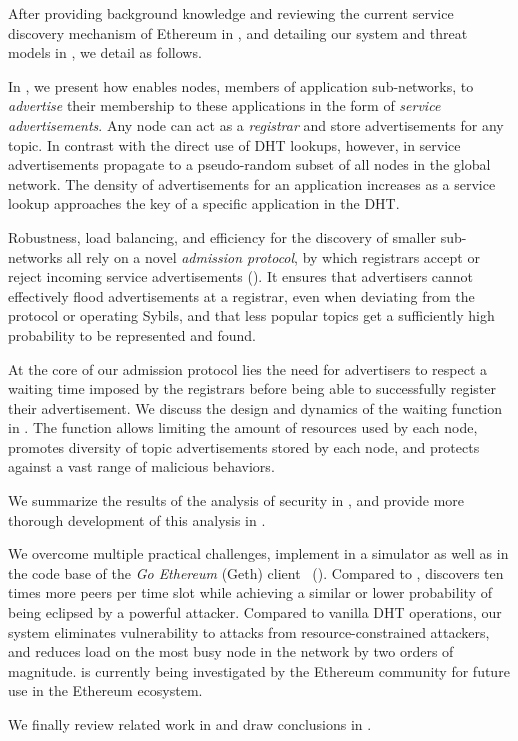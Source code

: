 After providing background knowledge and reviewing the current service discovery mechanism of Ethereum in , and detailing our system and threat models in , we detail \sysname as follows.

In , we present how \sysname enables nodes, members of application sub-networks, to \emph{advertise} their membership to these applications in the form of \emph{service advertisements}.
Any node can act as a \emph{registrar} and store advertisements for any topic.
In contrast with the direct use of DHT lookups, however, in \sysname service advertisements propagate to a pseudo-random subset of all nodes in the global network.
The density of advertisements for an application increases as a service lookup approaches the key of a specific application in the DHT.

Robustness, load balancing, and efficiency for the discovery of smaller sub-networks all rely on a novel \emph{admission protocol}, by which registrars accept or reject incoming service advertisements ().
It ensures that advertisers cannot effectively flood advertisements at a registrar, even when deviating from the protocol or operating Sybils, and that less popular topics get a sufficiently high probability to be represented and found.

At the core of our admission protocol lies the need for advertisers to respect a waiting time imposed by the registrars before being able to successfully register their advertisement.
We discuss the design and dynamics of the waiting function in .
The function allows limiting the amount of resources used by each node, promotes diversity of topic advertisements stored by each node, and protects against a vast range of malicious behaviors.

We summarize the results of the analysis of \sysname security in , and provide more thorough development of this analysis in .

We overcome multiple practical challenges, implement \sysname in a simulator as well as in the code base of the \emph{Go Ethereum} (Geth) client~\cite{geth} ().
Compared to \discv, \sysname discovers ten times more peers per time slot while achieving a similar or lower probability of being eclipsed by a powerful attacker.
Compared to vanilla DHT operations, our system eliminates vulnerability to attacks from resource-constrained attackers, and reduces load on the most busy node in the network by two orders of magnitude.
\sysname is currently being investigated by the Ethereum community for future use in the Ethereum ecosystem.

We finally review related work in  and draw conclusions in .
 